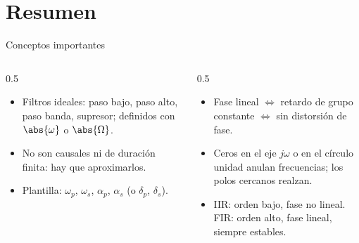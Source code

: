 \documentclass[aspectratio=169,11pt]{beamer}
\begin{document}
\section*{Resumen}
\begin{frame}{Conceptos importantes}
  \begin{columns}[T]
    \begin{column}{0.5\textwidth}
      \begin{itemize}
        \item Filtros ideales: paso bajo, paso alto, paso banda, supresor; definidos con $\abs{\omega}$ o $\abs{\Omega}$.
        \item No son causales ni de duración finita: hay que aproximarlos.
        \item Plantilla: $\omega_p$, $\omega_s$, $\alpha_p$, $\alpha_s$ (o $\delta_p$, $\delta_s$).
      \end{itemize}
    \end{column}
    \begin{column}{0.5\textwidth}
      \begin{itemize}
        \item Fase lineal $\Leftrightarrow$ retardo de grupo constante $\Leftrightarrow$ sin distorsión de fase.
        \item Ceros en el eje $j\omega$ o en el círculo unidad anulan frecuencias; los polos cercanos realzan.
        \item IIR: orden bajo, fase no lineal. FIR: orden alto, fase lineal, siempre estables.
      \end{itemize}
    \end{column}
  \end{columns}
  \bigskip
\end{frame}
\end{document}
